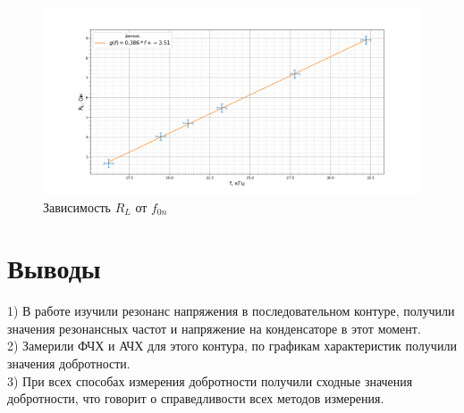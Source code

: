 \documentclass[a4paper, 12pt]{article}%
\begin{document}
	\begin{figure}[H]
		\centering
		\includegraphics[width=0.92\linewidth]{rl}
		\caption{Зависимость $R_L$ от $f_{0n}$}
		\label{fig:rl}
	\end{figure}
	
	\section{Выводы}
	1) В работе изучили резонанс напряжения в последовательном контуре, получили значения резонансных частот и напряжение на конденсаторе в этот момент.\\
	2) Замерили ФЧХ и АЧХ для этого контура, по графикам характеристик получили значения добротности. \\
	3) При всех способах измерения добротности получили сходные значения добротности, что говорит о справедливости всех методов измерения.\\
\end{document}

